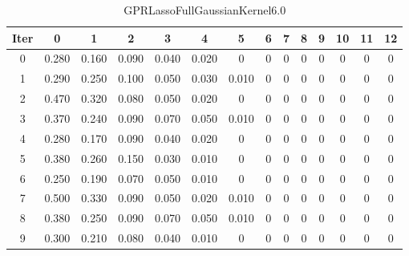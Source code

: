 \begin{table}
	\begin{center}
		\begin{tabular}{|c|c|c|c|c|c|c|c|c|c|c|c|c|c|}
			\hline
			Iter & 0 & 1 & 2 & 3 & 4 & 5 & 6 & 7 & 8 & 9 & 10 & 11 & 12 \\
			\hline
			0 & 0.280 & 0.160 & 0.090 & 0.040 & 0.020 & 0 & 0 & 0 & 0 & 0 & 0 & 0 & 0 \\
			\hline
			1 & 0.290 & 0.250 & 0.100 & 0.050 & 0.030 & 0.010 & 0 & 0 & 0 & 0 & 0 & 0 & 0 \\
			\hline
			2 & 0.470 & 0.320 & 0.080 & 0.050 & 0.020 & 0 & 0 & 0 & 0 & 0 & 0 & 0 & 0 \\
			\hline
			3 & 0.370 & 0.240 & 0.090 & 0.070 & 0.050 & 0.010 & 0 & 0 & 0 & 0 & 0 & 0 & 0 \\
			\hline
			4 & 0.280 & 0.170 & 0.090 & 0.040 & 0.020 & 0 & 0 & 0 & 0 & 0 & 0 & 0 & 0 \\
			\hline
			5 & 0.380 & 0.260 & 0.150 & 0.030 & 0.010 & 0 & 0 & 0 & 0 & 0 & 0 & 0 & 0 \\
			\hline
			6 & 0.250 & 0.190 & 0.070 & 0.050 & 0.010 & 0 & 0 & 0 & 0 & 0 & 0 & 0 & 0 \\
			\hline
			7 & 0.500 & 0.330 & 0.090 & 0.050 & 0.020 & 0.010 & 0 & 0 & 0 & 0 & 0 & 0 & 0 \\
			\hline
			8 & 0.380 & 0.250 & 0.090 & 0.070 & 0.050 & 0.010 & 0 & 0 & 0 & 0 & 0 & 0 & 0 \\
			\hline
			9 & 0.300 & 0.210 & 0.080 & 0.040 & 0.010 & 0 & 0 & 0 & 0 & 0 & 0 & 0 & 0 \\
			\hline
		\end{tabular}
	\end{center}
	\caption{GPRLassoFullGaussianKernel6.0}
\end{table}